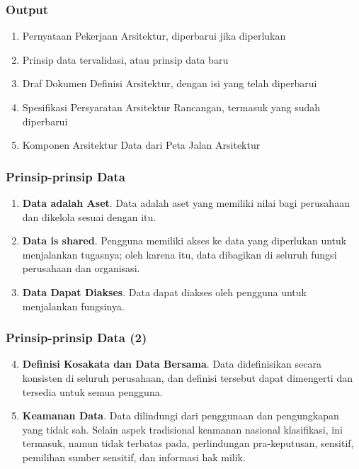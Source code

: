 \documentclass[aspectratio=169, table]{beamer}
\begin{document}
	\begin{frame}
		\frametitle{Output}
		\begin{enumerate}
			\item Pernyataan Pekerjaan Arsitektur, diperbarui jika diperlukan
			\item Prinsip data tervalidasi, atau prinsip data baru
			\item Draf Dokumen Definisi Arsitektur, dengan isi yang telah diperbarui
			\item Spesifikasi Persyaratan Arsitektur Rancangan, termasuk yang sudah diperbarui
			\item Komponen Arsitektur Data dari Peta Jalan Arsitektur
		\end{enumerate}
	\end{frame}
	
	\begin{frame}
		\frametitle{Prinsip-prinsip Data}
		\begin{enumerate}
			\item \textbf{Data adalah Aset}.
			Data adalah aset yang memiliki nilai bagi perusahaan dan dikelola sesuai dengan itu.
			\item \textbf{Data is shared}.
			Pengguna memiliki akses ke data yang diperlukan untuk menjalankan tugasnya; oleh karena itu, data dibagikan di seluruh fungsi perusahaan
			dan organisasi.
			\item \textbf{Data Dapat Diakses}. Data dapat diakses oleh pengguna untuk menjalankan fungsinya.
		\end{enumerate}
	\end{frame}
	
	\begin{frame}
		\frametitle{Prinsip-prinsip Data (2)}
		\begin{enumerate}
			\setcounter{enumi}{3}
			\item \textbf{Definisi Kosakata dan Data Bersama}. Data didefinisikan secara konsisten di seluruh perusahaan, dan definisi tersebut dapat dimengerti dan tersedia untuk semua pengguna.
			\item \textbf{Keamanan Data}.
			Data dilindungi dari penggunaan dan pengungkapan yang tidak sah. Selain aspek tradisional keamanan nasional
			klasifikasi, ini termasuk, namun tidak terbatas pada, perlindungan pra-keputusan, sensitif, pemilihan sumber sensitif, dan
			informasi hak milik.
		\end{enumerate}
	\end{frame}
	
\end{document}
